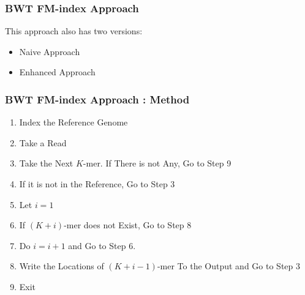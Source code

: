 \begin{frame}
	\frametitle{BWT FM-index Approach}
	This approach also has two versions:
	\begin{itemize}
		\item<1-> Naive Approach
		\item<1-> Enhanced Approach
	\end{itemize}
\end{frame}

\begin{frame}
	\frametitle{BWT FM-index Approach : Method}
	\begin{enumerate}
		\item<1-> Index the Reference Genome
		\item<1-> Take a Read
		\item<1-> Take the Next $K$-mer. If There is not Any, Go to Step 9
		\item<2-> If it is not in the Reference, Go to Step 3
		\item<2-> Let $i = 1$
		\item<2-> If $(K+i)$-mer does not Exist, Go to Step 8
		\item<2-> Do $i = i + 1$ and Go to Step 6.
		\item<2-> Write the Locations of $(K+i-1)$-mer To the Output and Go to Step 3
		\item<1-> Exit
	\end{enumerate}
\end{frame}

